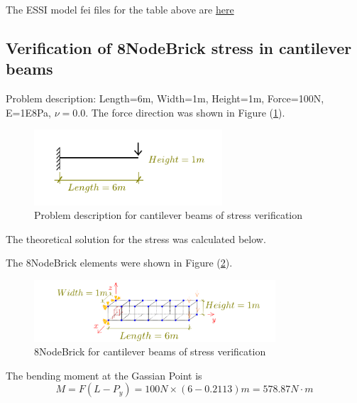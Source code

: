 \documentclass[fleqn,11pt,letter]{article}
\begin{document}
The ESSI model fei files for the table above are \href{https://github.com/yuan-energy/ESSI_Verification/blob/master/8NodeBrick/clamped_beam_cut/clamped_beam_cut.tar.gz?raw=true}{here}








\newpage
\subsection{Verification of 8NodeBrick stress in cantilever beams}





Problem description: Length=6m, Width=1m, Height=1m, Force=100N, E=1E8Pa, $\nu=0.0$. The force direction was shown in Figure (\ref{fig Problem description for cantilever beams of stress verification}). 

\begin{figure}[H]
  \centering
  \includegraphics[width=7cm]{../Figure_files/8NodeBrick/cantilever_6.pdf}
  \caption{Problem description for cantilever beams of stress verification}
  \label{fig Problem description for cantilever beams of stress verification}
\end{figure}

The theoretical solution for the stress was calculated below. 

The 8NodeBrick elements were shown in Figure (\ref{fig 8NodeBrick for cantilever beams of stress verification}).
\begin{figure}[H]
  \centering
  \includegraphics[width=9cm]{../Figure_files/8NodeBrick/beam_8brick_6div_gp.pdf}
  \caption{8NodeBrick for cantilever beams of stress verification}
  \label{fig 8NodeBrick for cantilever beams of stress verification}
\end{figure}

The bending moment at the Gassian Point is 
\begin{equation}
  M=F(L-P_y)=100 N \times (6-0.2113) m = 578.87 N\cdot m
\end{equation}
\end{document}
